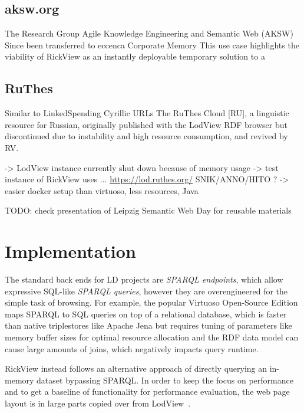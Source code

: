 \documentclass{ceurart}
\begin{document}
\citep{linkedspending}
\citep{hdt}

\subsection{aksw.org}
The Research Group Agile Knowledge Engineering and Semantic Web (AKSW)
Since been transferred to eccenca Corporate Memory
This use case highlights the viability of RickView as an instantly deployable temporary solution to a


\subsection{RuThes}
\citep{adaptinglodview}
Similar to LinkedSpending
Cyrillic URLs
The RuThes Cloud [RU], a linguistic resource for Russian, originally published with the LodView RDF browser but discontinued due to instability and high resource consumption, and revived by RV.

-> LodView instance currently shut down because of memory usage
-> test instance of RickView uses ...
\url{https://lod.ruthes.org/}
SNIK/ANNO/HITO ?
-> easier docker setup than virtuoso, less resources, Java



TODO: check presentation of Leipzig Semantic Web Day for reusable materials

\section{Implementation}\label{implementation}

The standard back ends for LD projects are \emph{SPARQL endpoints}, which allow expressive SQL-like \emph{SPARQL queries}, however they are overengineered for the simple task of browsing.
For example, the popular Virtuoso Open-Source Edition maps SPARQL to SQL queries on top of a relational database, which is faster than native triplestores like Apache Jena but requires tuning of parameters like memory buffer sizes for optimal resource allocation and the RDF data model can cause large amounts of joins, which negatively impacts query runtime.

RickView instead follows an alternative approach of directly querying an in-memory dataset bypassing SPARQL.
In order to keep the focus on performance and to get a baseline of functionality for performance evaluation, the web page layout is in large parts copied
over from LodView~\citep{lodview,adaptinglodview}.
%
%
\end{document}
